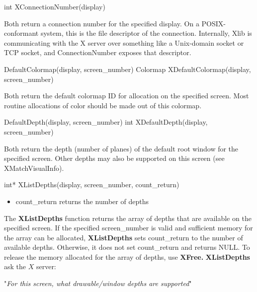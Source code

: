 \documentclass{report}
\begin{document}
\begin{itemize}
\begin{cppcode}
            int XConnectionNumber(display)
            \end{cppcode}
            \bigbreak \noindent 
            Both return a connection number for the specified display. On a POSIX-conformant system, this is the file descriptor of the connection.
            \bigbreak \noindent 
            Internally, Xlib is communicating with the X server over something like a Unix-domain socket or TCP socket, and ConnectionNumber exposes that descriptor.
            \bigbreak \noindent 
            \begin{cppcode}
            DefaultColormap(display, screen_number)
            Colormap XDefaultColormap(display, screen_number)
            \end{cppcode}
            \bigbreak \noindent 
            Both return the default colormap ID for allocation on the specified screen. Most routine allocations of color should be made out of this colormap.
            \bigbreak \noindent 
            \begin{cppcode}
            DefaultDepth(display, screen_number)
            int XDefaultDepth(display, screen_number)
            \end{cppcode}
            \bigbreak \noindent 
            Both return the depth (number of planes) of the default root window for the speciﬁed screen. Other depths may also be supported on this screen (see XMatchVisualInfo).
            \bigbreak \noindent 
            \begin{cppcode}
            int* XListDepths(display, screen_number, count_return)
            \end{cppcode}
            \bigbreak \noindent
            \begin{itemize}
                \item count\_return returns the number of depths
            \end{itemize}
            The \textbf{XListDepths}  function returns the array of depths that are available on the specified screen. If the specified screen\_number is valid and sufficient memory for the array can be allocated, \textbf{XListDepths} sets count\_return to the number of available depths. Otherwise, it does not set count\_return and returns NULL. To release the memory allocated for the array of depths, use \textbf{XFree.}
            \bigbreak \noindent 
            \textbf{XListDepths} ask the $X$ server:
            \begin{center}
                "\textit{For this screen, what drawable/window depths are supported}"

\end{center}
\end{itemize}
\end{document}
